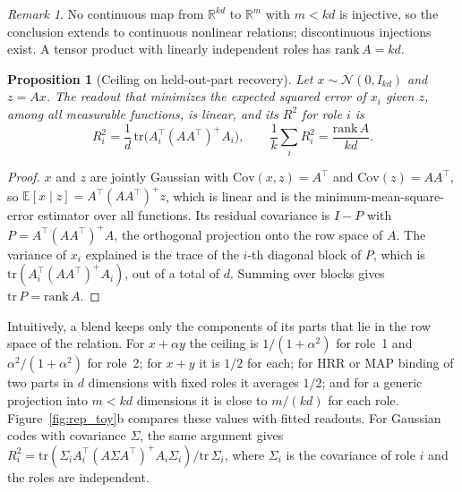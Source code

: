 \documentclass[10pt]{article}
\theoremstyle{plain}
\newtheorem{proposition}{Proposition}
\theoremstyle{remark}
\newtheorem*{remark}{Remark}
\newcommand{\R}{\mathbb{R}}
\begin{document}
\begin{remark}
No continuous map from $\R^{kd}$ to $\R^m$ with $m < kd$ is injective, so the conclusion extends to continuous nonlinear relations; discontinuous injections exist. A tensor product with linearly independent roles has $\mathrm{rank}\,A = kd$.
\end{remark}

\begin{proposition}[Ceiling on held-out-part recovery]
\label{prop:ceiling}
Let $x \sim \mathcal{N}(0, I_{kd})$ and $z = Ax$. The readout that minimizes the expected squared error of $x_i$ given $z$, among all measurable functions, is linear, and its $R^2$ for role $i$ is
\begin{equation}
  R^2_i = \frac{1}{d}\,\mathrm{tr}\big(A_i^{\top} (A A^{\top})^{+} A_i\big), \qquad \frac{1}{k}\sum_i R^2_i = \frac{\mathrm{rank}\,A}{kd}.
\end{equation}
\end{proposition}

\begin{proof}
$x$ and $z$ are jointly Gaussian with $\mathrm{Cov}(x, z) = A^{\top}$ and $\mathrm{Cov}(z) = AA^{\top}$, so $\mathbb{E}[x \mid z] = A^{\top}(AA^{\top})^{+}z$, which is linear and is the minimum-mean-square-error estimator over all functions. Its residual covariance is $I - P$ with $P = A^{\top}(AA^{\top})^{+}A$, the orthogonal projection onto the row space of $A$. The variance of $x_i$ explained is the trace of the $i$-th diagonal block of $P$, which is $\mathrm{tr}(A_i^{\top}(AA^{\top})^{+}A_i)$, out of a total of $d$. Summing over blocks gives $\mathrm{tr}\,P = \mathrm{rank}\,A$.
\end{proof}

\noindent
Intuitively, a blend keeps only the components of its parts that lie in the row space of the relation. For $x + \alpha y$ the ceiling is $1/(1 + \alpha^2)$ for role~1 and $\alpha^2/(1 + \alpha^2)$ for role~2; for $x + y$ it is $1/2$ for each; for HRR or MAP binding of two parts in $d$ dimensions with fixed roles it averages $1/2$; and for a generic projection into $m < kd$ dimensions it is close to $m/(kd)$ for each role. Figure~\ref{fig:rep_toy}b compares these values with fitted readouts. For Gaussian codes with covariance $\Sigma$, the same argument gives $R^2_i = \mathrm{tr}(\Sigma_i A_i^{\top}(A\Sigma A^{\top})^{+}A_i\Sigma_i)/\mathrm{tr}\,\Sigma_i$, where $\Sigma_i$ is the covariance of role $i$ and the roles are independent.
\end{document}
